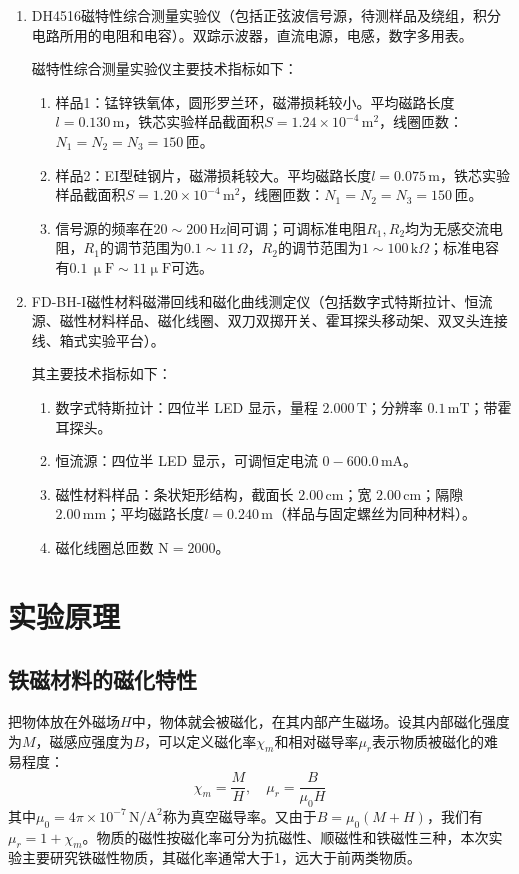 \documentclass[12pt]{article}
\begin{document}
\begin{enumerate}
    \item DH4516磁特性综合测量实验仪（包括正弦波信号源，待测样品及绕组，积分电路所用的电阻和电容）。双踪示波器，直流电源，电感，数字多用表。
    
    磁特性综合测量实验仪主要技术指标如下：

    \begin{enumerate}
        \item 样品1：锰锌铁氧体，圆形罗兰环，磁滞损耗较小。平均磁路长度$ l=0.130\,\mathrm{m} $，铁芯实验样品截面积$ S=1.24\times10^{-4}\,\mathrm{m}^2 $，线圈匝数：$ N_1=N_2=N_3=150\,\text{匝} $。
        \item 样品2：EI型硅钢片，磁滞损耗较大。平均磁路长度$ l=0.075\,\mathrm m $，铁芯实验样品截面积$ S=1.20\times10^{-4}\,\mathrm m^2 $，线圈匝数：$ N_1=N_2=N_3=150\,\text{匝} $。
        \item 信号源的频率在$ 20\sim 200\,\mathrm{Hz} $间可调；可调标准电阻$ R_1,R_2 $均为无感交流电阻，$ R_1 $的调节范围为$ 0.1\sim 11\,\Omega $，$ R_2 $的调节范围为$ 1\sim 100\,\mathrm k\Omega $；标准电容有$ 0.1\,\upmu\mathrm F\sim 11\upmu\mathrm F $可选。
    \end{enumerate}

    \item FD-BH-I磁性材料磁滞回线和磁化曲线测定仪（包括数字式特斯拉计、恒流源、磁性材料样品、磁化线圈、双刀双掷开关、霍耳探头移动架、双叉头连接线、箱式实验平台）。
    
    其主要技术指标如下：

    \begin{enumerate}
        \item 数字式特斯拉计：四位半 LED 显示，量程 $2.000\,\mathrm{T}$；分辨率 $0.1\,\mathrm{mT}$；带霍耳探头。
        \item 恒流源：四位半 LED 显示，可调恒定电流 $0-600.0\,\mathrm{mA}$。
        \item 磁性材料样品：条状矩形结构，截面长 $2.00\,\mathrm{cm}$；宽 $2.00\,\mathrm{cm}$；隔隙 $2.00\,\mathrm{mm}$；平均磁路长度$l=0.240\,\mathrm{m}$（样品与固定螺丝为同种材料）。
        \item 磁化线圈总匝数 $\mathrm{N}=2000$。
    \end{enumerate}
\end{enumerate}

\section{实验原理}
\subsection{铁磁材料的磁化特性}
把物体放在外磁场$ H $中，物体就会被磁化，在其内部产生磁场。设其内部磁化强度为$ M $，磁感应强度为$ B $，可以定义磁化率$ \chi_m $和相对磁导率$ \mu_r $表示物质被磁化的难易程度：
\[\chi_m=\frac MH,\quad \mu_r=\frac{B}{\mu_0 H}\]
其中$ \mu_0=4\pi\times10^{-7}\,\mathrm{N/A^2} $称为真空磁导率。又由于$ B=\mu_0(M+H) $，我们有$ \mu_r=1+\chi_m $。物质的磁性按磁化率可分为抗磁性、顺磁性和铁磁性三种，本次实验主要研究铁磁性物质，其磁化率通常大于1，远大于前两类物质。
\end{document}
